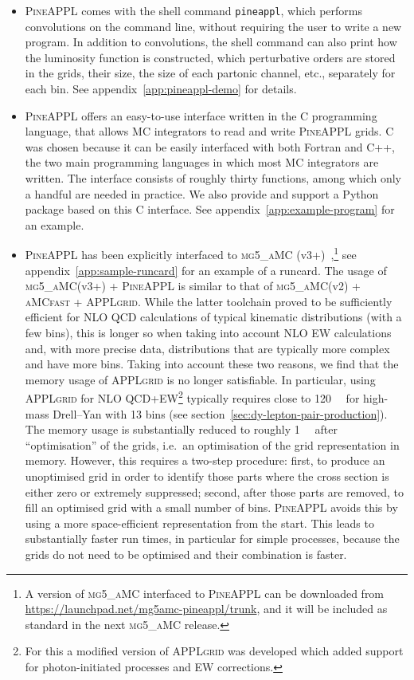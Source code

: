 \begin{itemize}

\item \textsc{PineAPPL} comes with the shell command \texttt{pineappl}, which performs convolutions on the command line, without requiring the user to write a new program.
In addition to convolutions, the shell command can also print how the luminosity function is constructed, which perturbative orders are stored in the grids, their size, the size of each partonic channel, etc., separately for each bin. See appendix~\ref{app:pineappl-demo} for details.
  
\item \textsc{PineAPPL} offers an easy-to-use interface written in the C programming language, that allows MC integrators to read and write \textsc{PineAPPL} grids.
C was chosen because it can be easily interfaced with both Fortran and C++, the two main programming languages in which most MC integrators are written.
The interface consists of roughly thirty functions, among which only a handful are needed in practice.
We also provide and support a Python package based on this C interface.
See appendix~\ref{app:example-program} for an example.

\item \textsc{PineAPPL} has been explicitly interfaced to \textsc{mg5\_aMC} (v3+)~\cite{Alwall:2014hca,Frederix:2018nkq},\footnote{A version of \textsc{mg5\_aMC} interfaced to \textsc{PineAPPL} can be downloaded from \url{https://launchpad.net/mg5amc-pineappl/trunk}, and it will be included as standard in the next \textsc{mg5\_aMC} release.} see appendix~\ref{app:sample-runcard} for an example of a runcard.
The usage of \textsc{mg5\_aMC}(v3+) + \textsc{PineAPPL} is similar to that of \textsc{mg5\_aMC}(v2) + \textsc{aMCfast} + \textsc{APPLgrid}.
While the latter toolchain proved to be sufficiently efficient for NLO QCD calculations of typical kinematic distributions (with a few bins), this is longer so when taking into account NLO EW calculations and, with more precise data, distributions that are typically more complex and have more bins.
Taking into account these two reasons, we find that the memory usage of \textsc{APPLgrid} is no longer satisfiable.
In particular, using \textsc{APPLgrid} for NLO QCD+EW\footnote{For this a modified version of \textsc{APPLgrid} was developed which added support for photon-initiated processes and EW corrections.} typically requires close to \SI{120}{\giga\byte} for high-mass Drell--Yan with 13 bins (see section~\ref{sec:dy-lepton-pair-production}).
The memory usage is substantially reduced to roughly \SI{1}{\giga\byte} after \enquote{optimisation} of the grids, i.e.\ an optimisation of the grid representation in memory.
However, this requires a two-step procedure: first, to produce an unoptimised grid in order to identify those parts where the cross section is either zero or extremely suppressed; second, after those parts are removed, to fill an optimised grid with a small number of bins.
\textsc{PineAPPL} avoids this by using a more space-efficient representation from the start. This leads to substantially faster run times, in particular for simple processes, because the grids do not need to be optimised 
and their combination is faster.


\end{itemize}
